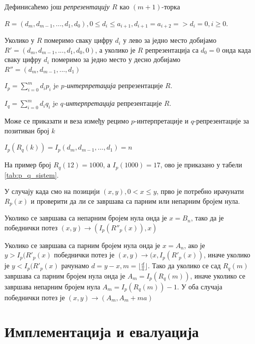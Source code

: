 \documentclass[a4paper]{article}
\begin{document}
Дефинисаћемо још \textit{репрезентацију $ R $} као $ (m+1) $-торка 
\begin{center}
	$ R = (d_{m}, d_{m-1}, ... , d_{1}, d_{0}), 0 \le d_{i} \le a_{i+1}, d_{i+1} = a_{i+2} => d_{i} = 0, i \ge 0 $.
\end{center}

Уколико у $ R $ померимо сваку цифру $ d_{i} $ у лево за једно место добијамо $ R' = (d_{m}, d_{m-1}, ... , d_{1}, d_{0}, 0) $, а уколико је $ R $ репрезентација са $ d_{0} = 0 $ онда када сваку цифру $ d_{i} $ померимо за једно место у десно добијамо $ R'' = (d_{m}, d_{m-1}, ... , d_{1}) $ 

$ I_{p} = \sum_{i=0}^{m} d_{i}p_{i} $ je \textit{$ p $-интерпретација} репрезентације $ R $.

$ I_{q} = \sum_{i=0}^{m} d_{i}q_{i} $ je \textit{$ q $-интерпретација} репрезентације $ R $.

Може се приказати и веза између рецимо $ p $-интерпретације и $ q $-репрезентације за позитиван број $ k $
\begin{center}
	$ I_{p}(R_{q}(k)) = I_{p}(d_{m}, d_{m-1}, ..., d_{1}) = n $
\end{center} 

На пример број $ R_{q}(12) = 1000 $, а $ I_{p}(1000) = 17 $, ово је приказано у табели \ref{tab:p_q_sistem}.

У случају када смо на позицији $ (x, y), 0 < x \le y $, прво је потребно ирачунати $ R_{p}(x) $ и проверити да ли се завршава са парним или непарним бројем нула.

Уколико се завршава са непарним бројем нула онда је $ x = B_{n} $, тако да је победнички потез $ (x, y) \rightarrow (I_{p}(R''_{p}(x)), x) $

Уколико се завршава са парним бројем нула онда је $ x = A_{n} $, ако је $ y > I_{p}(R'_{p}(x) $ победнички потез је $ (x, y) \rightarrow (x, I_{p}(R'_{p}(x)) $, иначе уколико је $ y < I_{p}(R'_{p}(x) $ рачунамо $ d = y - x, m = \lfloor \frac{d}{a} \rfloor $. Тако да уколико се сад $ R_{q}(m) $ завршава са парним бројем нула онда је $ A_{m} = I_{p}(R_{q}(m)) $, иначе уколико се завршава непарним бројем нула $ A_{m} = I_{p}(R_{q}(m)) - 1 $. У оба случаја победнички потез је $ (x, y) \rightarrow (A_{m}, A_{m} + ma) $

\section{Имплементација и евалуација}
\label{implementacija_evaluacija}
\end{document}
